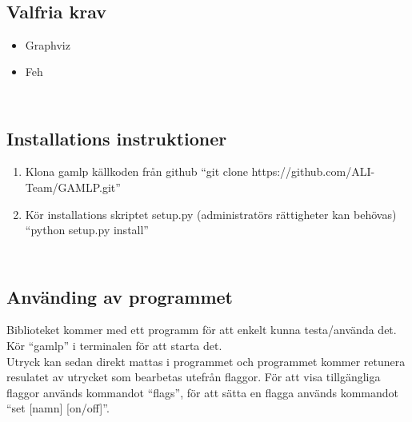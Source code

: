 \documentclass[12pt,a4paper]{article}
\begin{document}
\begin{appendices}
\subsection{\\Valfria krav}
\begin{itemize}
  \item Graphviz
  \item Feh
\end{itemize}
\subsection{\\Installations instruktioner}
\begin{enumerate}
  \item Klona gamlp källkoden från github ``git clone https://github.com/ALI-Team/GAMLP.git''
  \item Kör installations skriptet setup.py (administratörs rättigheter kan behövas) ``python setup.py install''
\end{enumerate}
\subsection{\\Använding av programmet}
Biblioteket kommer med ett programm för att enkelt kunna testa/använda det. Kör ``gamlp'' i terminalen för att starta det.\\
Utryck kan sedan direkt mattas i programmet och programmet kommer retunera resulatet av utrycket som bearbetas utefrån flaggor. För att visa tillgängliga flaggor används kommandot ``flags'', för att sätta en flagga används kommandot ``set [namn] [on/off]''.
\end{appendices}
\end{document}
